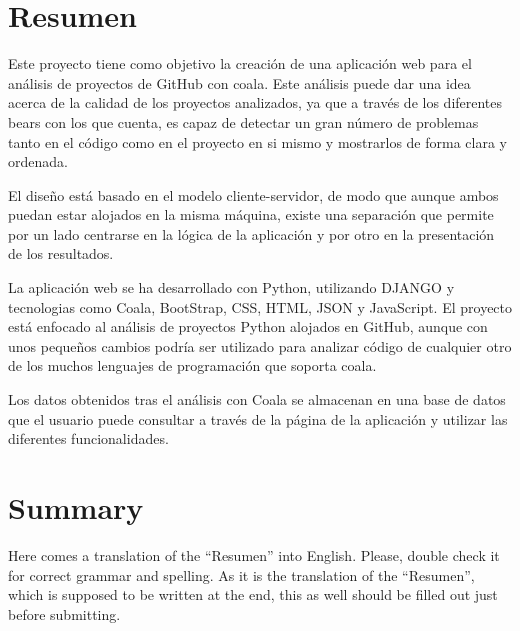 \documentclass[a4paper, 12pt]{book}
\begin{document}

\chapter*{Resumen}

Este proyecto tiene como objetivo la creación de una aplicación web para el análisis de
proyectos de GitHub con coala. Este análisis puede dar una idea acerca de la calidad de
los proyectos analizados, ya que a través de los diferentes bears con los que cuenta, es
capaz de detectar un gran número de problemas tanto en el código como en el proyecto en si mismo
y mostrarlos de forma clara y ordenada.

El diseño está basado en el modelo cliente-servidor, de modo que aunque ambos puedan estar
alojados en la misma máquina, existe una separación que permite por un lado centrarse en la
lógica de la aplicación y por otro en la presentación de los resultados.

La aplicación web se ha desarrollado con Python, utilizando DJANGO y tecnologias como Coala, 
BootStrap, CSS, HTML, JSON y JavaScript. El proyecto está enfocado al análisis de proyectos 
Python alojados en GitHub, aunque con unos pequeños cambios podría ser utilizado para analizar 
código de cualquier otro de los muchos lenguajes de programación que soporta coala.

Los datos obtenidos tras el análisis con Coala se almacenan en una base de datos que el usuario
puede consultar a través de la página de la aplicación y utilizar las diferentes funcionalidades.

\chapter*{Summary}

Here comes a translation of the ``Resumen'' into English. Please, double check
it for correct grammar and spelling. As it is the translation of the ``Resumen'',
which is supposed to be written at the end, this as well should be filled out
just before submitting.
\end{document}
